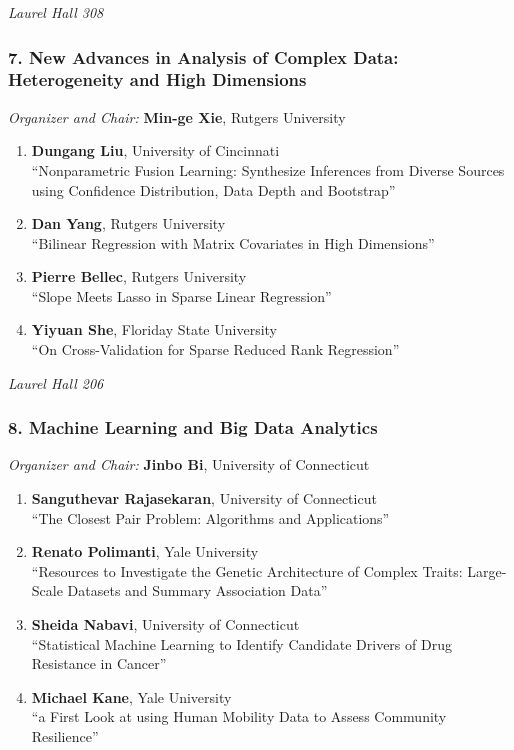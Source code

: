 \emph{Laurel Hall 308} \\[.5em]

\subsubsection*{7. New Advances in Analysis of Complex Data: Heterogeneity and High Dimensions}

\emph{Organizer and Chair:} \textbf{Min-ge Xie}, Rutgers University

\begin{enumerate}
\item \textbf{Dungang Liu}, University of Cincinnati \\
``Nonparametric Fusion Learning: Synthesize Inferences from Diverse Sources using Confidence Distribution, Data Depth and Bootstrap''
\item \textbf{Dan Yang}, Rutgers University \\
``Bilinear Regression with Matrix Covariates in High Dimensions''
\item \textbf{Pierre Bellec}, Rutgers University \\
``Slope Meets Lasso in Sparse Linear Regression''
\item \textbf{Yiyuan She}, Floriday State University \\
``On Cross-Validation for Sparse Reduced Rank Regression''
\end{enumerate}

\emph{Laurel Hall 206} \\[.5em]

\subsubsection*{8. Machine Learning and Big Data Analytics}

\emph{Organizer and Chair:} \textbf{Jinbo Bi}, University of Connecticut

\begin{enumerate}
\item \textbf{Sanguthevar Rajasekaran}, University of Connecticut \\
``The Closest Pair Problem: Algorithms and Applications''
\item \textbf{Renato Polimanti}, Yale University \\
``Resources to Investigate the Genetic Architecture of Complex Traits: Large-Scale Datasets and Summary Association Data''
\item \textbf{Sheida Nabavi}, University of Connecticut \\
``Statistical Machine Learning to Identify Candidate Drivers of Drug Resistance in Cancer''
\item \textbf{Michael Kane}, Yale University \\
``a First Look at using Human Mobility Data to Assess Community Resilience''
\end{enumerate}

